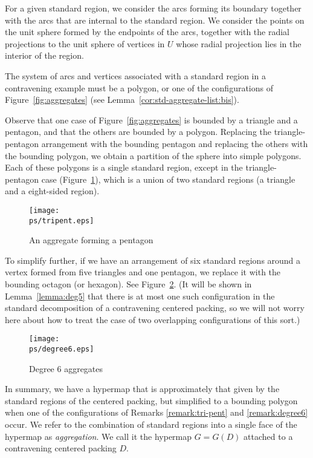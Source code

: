 For a given standard region, we consider the arcs forming its
boundary together with the arcs that are internal to the standard
region.  We consider the points on the unit sphere formed by the
endpoints of the arcs, together with the radial projections to the
unit sphere of vertices in $U$ whose radial projection lies in the
interior of the region.

\begin{remark}
The system of arcs and vertices associated with a standard region in
a contravening example must be a polygon, or one of the
configurations of Figure~\ref{fig:aggregates} (see
Lemma~\ref{cor:std-aggregate-list:bis}).
\end{remark}


\begin{remark} \label{remark:tri-pent}
Observe that one case of Figure~\ref{fig:aggregates} is bounded by a
triangle and a pentagon, and that the others are bounded by a
polygon. Replacing the triangle-pentagon arrangement with the
bounding pentagon and replacing the others with the bounding
polygon, we obtain a partition of the sphere into simple polygons.
Each of these polygons is a single standard region, except in the
triangle-pentagon case (Figure~\ref{fig:tri-pent}), which is a union
of two standard regions (a triangle and a eight-sided region).
\end{remark}
\begin{figure}[htb]
  \centering
  \texttt{[image: \\ps/tripent.eps]}
  \caption{An aggregate forming a pentagon}
  \label{fig:tri-pent}
\end{figure}

\begin{remark}\label{remark:degree6}
To simplify further, if we have an arrangement of six standard
regions around a vertex formed from five triangles and one
pentagon, we replace it with the bounding octagon (or hexagon).
See Figure~\ref{fig:degree6}.  (It will be shown in
Lemma~\ref{lemma:deg5} that there is at most one such
configuration in the standard decomposition of a contravening
centered packing, so we will not worry here about how to treat the
case of two overlapping configurations of this sort.)
\end{remark}
\begin{figure}[htb]
  \centering
  \texttt{[image: \\ps/degree6.eps]}
  \caption{Degree $6$ aggregates}
  \label{fig:degree6}
\end{figure}

In summary, we have a hypermap that is approximately that given by
the standard regions of the centered packing, but simplified to a
bounding polygon when one of the configurations of Remarks
\ref{remark:tri-pent} and \ref{remark:degree6} occur.  We refer to
the combination of standard regions into a single face of the
hypermap as {\it aggregation}.  We call it the hypermap $G = G(D)$
attached to a contravening centered packing $D$.
%

